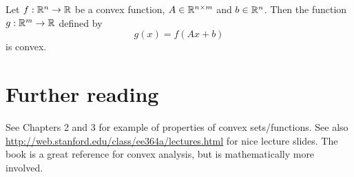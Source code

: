 \documentclass[11pt,nocut]{article}
\begin{document}
\begin{proposition}
	Let $f: \mathbb{R}^n \to \mathbb{R}$ be a convex function, $A \in \mathbb{R}^{n \times m}$ and $b\in\mathbb{R}^n$.
	Then the function $g: \mathbb{R}^m \to \mathbb{R}$ defined by
	$$
	g(x) = f(Ax + b)
	$$
	is convex.
\end{proposition}


\section*{Further reading}

See \cite{boyd2004convex} Chapters 2 and 3 for example of properties of convex sets/functions. See also \url{http://web.stanford.edu/class/ee364a/lectures.html} for nice lecture slides.
The book \cite{rockafellar1970convex} is a great reference for convex analysis, but is mathematically more involved.


\vspace{1cm}
\centerline{}




\end{document}
